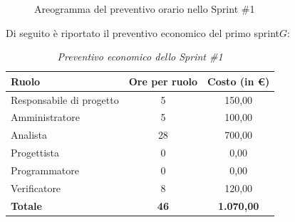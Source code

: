 \documentclass[a4paper, 10pt, colorlinks=true, linkcolor=black, urlcolor=blue, citecolor=blue, hidelinks]{article}
\renewcommand{\arraystretch}{1.2}
\begin{document}
\begin{figure}[H]

\caption{Areogramma del preventivo orario nello Sprint \#1}
\label{fig:preventivo-sprint1}
\end{figure}

Di seguito è riportato il preventivo economico del primo sprint$G$:

\begin{table}[H]
    \centering
    \renewcommand{\arraystretch}{1.4}
    \begin{tabular}{|l|c|c|}
        \hline
        \rowcolor{bluBitless!15}
        \textbf{Ruolo} & \textbf{Ore per ruolo} & \textbf{Costo (in €)} \\
        \hline
        Responsabile di progetto & 5 & 150,00 \\ \hline
        Amministratore & 5 & 100,00 \\ \hline  
        Analista & 28 & 700,00 \\ \hline
        Progettista & 0 & 0,00 \\ \hline
        Programmatore & 0 & 0,00 \\ \hline
        Verificatore & 8 & 120,00 \\ \hline
        \rowcolor{bluBitless!8}
        \textbf{Totale} & \textbf{46} & \textbf{1.070,00} \\ \hline
    \end{tabular}
    \caption{\textit{Preventivo economico dello Sprint \#1}}
\end{table}
\end{document}
